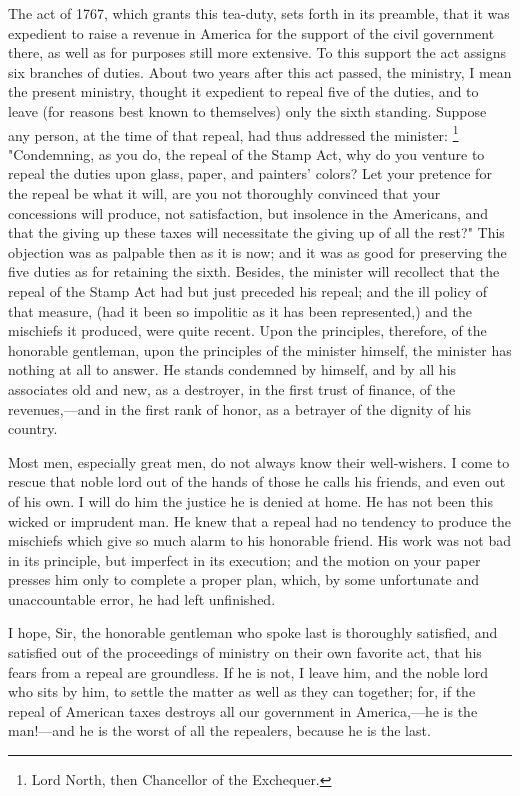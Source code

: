 The act of 1767, which grants this tea-duty, sets forth in its preamble, that it was expedient to raise a revenue in America for the support of the civil government there, as well as for purposes still more extensive. To this support the act assigns six branches of duties. About two years after this act passed, the ministry, I mean the present ministry, thought it expedient to repeal five of the duties, and to leave (for reasons best known to themselves) only the sixth standing. Suppose any person, at the time of that repeal, had thus addressed the minister:
\footnote{Lord North, then Chancellor of the Exchequer.}
"Condemning, as you do, the repeal of the Stamp Act, why do you venture to repeal the duties upon glass, paper, and painters' colors? Let your pretence for the repeal be what it will, are you not thoroughly convinced that your concessions will produce, not satisfaction, but insolence in the Americans, and that the giving up these taxes will necessitate the giving up of all the rest?" This objection was as palpable then as it is now; and it was as good for preserving the five duties as for retaining the sixth. Besides, the minister will recollect that the repeal of the Stamp Act had but just preceded his repeal; and the ill policy of that measure, (had it been so impolitic as it has been represented,) and the mischiefs it produced, were quite recent. Upon the principles, therefore, of the honorable gentleman, upon the principles of the minister himself, the minister has nothing at all to answer. He stands condemned by himself, and by all his associates old and new, as a destroyer, in the first trust of finance, of the revenues,—and in the first rank of honor, as a betrayer of the dignity of his country.

Most men, especially great men, do not always know their well-wishers. I come to rescue that noble lord out of the hands of those he calls his friends, and even out of his own. I will do him the justice he is denied at home. He has not been this wicked or imprudent man. He knew that a repeal had no tendency to produce the mischiefs which give so much alarm to his honorable friend. His work was not bad in its principle, but imperfect in its execution; and the motion on your paper presses him only to complete a proper plan, which, by some unfortunate and unaccountable error, he had left unfinished.

I hope, Sir, the honorable gentleman who spoke last is thoroughly satisfied, and satisfied out of the proceedings of ministry on their own favorite act, that his fears from a repeal are groundless. If he is not, I leave him, and the noble lord who sits by him, to settle the matter as well as they can together; for, if the repeal of American taxes destroys all our government in America,—he is the man!—and he is the worst of all the repealers, because he is the last.

